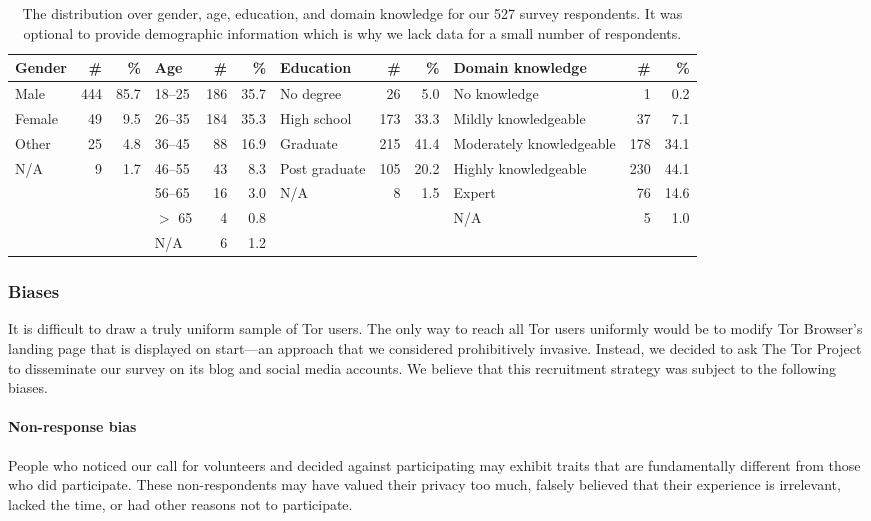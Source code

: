 \begin{table*}[t]
	\centering
	\begin{tabular}{l r r | l r r | l r r | l r r}
	\toprule
	Gender & \# & \% &
	Age & \# & \% &
	Education & \# & \% &
	Domain knowledge & \# & \% \\
	\midrule
	Male   & 444 & 85.7 & 18--25 & 186 & 35.7 & No degree     &  26 & 5.0  & No knowledge             &   1 & 0.2  \\
	Female &  49 &  9.5 & 26--35 & 184 & 35.3 & High school   & 173 & 33.3 & Mildly knowledgeable     &  37 & 7.1  \\
	Other  &  25 &  4.8 & 36--45 &  88 & 16.9 & Graduate      & 215 & 41.4 & Moderately knowledgeable & 178 & 34.1 \\
	N/A    &   9 &  1.7 & 46--55 &  43 &  8.3 & Post graduate & 105 & 20.2 & Highly knowledgeable     & 230 & 44.1 \\
	       &     &      & 56--65 &  16 &  3.0 & N/A           &   8 &  1.5 & Expert                   &  76 & 14.6 \\
	       &     &      & $>$ 65 &   4 &  0.8 &               &     &      & N/A                      &   5 &  1.0 \\
	       &     &      & N/A    &   6 &  1.2 &               &     &      &                          &     & \\
	\bottomrule
	\end{tabular}
	\caption{The distribution over gender, age, education, and domain knowledge
	for our 527 survey respondents.  It was optional to provide demographic
	information which is why we lack data for a small number of respondents.}
	\label{tab:survey-demo}
\end{table*}


\subsubsection{Biases}

It is difficult to draw a truly uniform sample of Tor users.  The only way to
reach all Tor users uniformly would be to modify Tor Browser's landing page
that is displayed on start---an approach that we considered prohibitively
invasive.  Instead, we decided to ask The Tor Project to disseminate our survey
on its blog and social media accounts.  We believe that this recruitment
strategy was subject to the following biases.

\paragraph{Non-response bias} 
People who noticed our call for volunteers and decided against participating
may exhibit traits that are fundamentally different from those who did
participate.  These non-respondents may have valued their privacy too much,
falsely believed that their experience is irrelevant, lacked the time, or had
other reasons not to participate.

